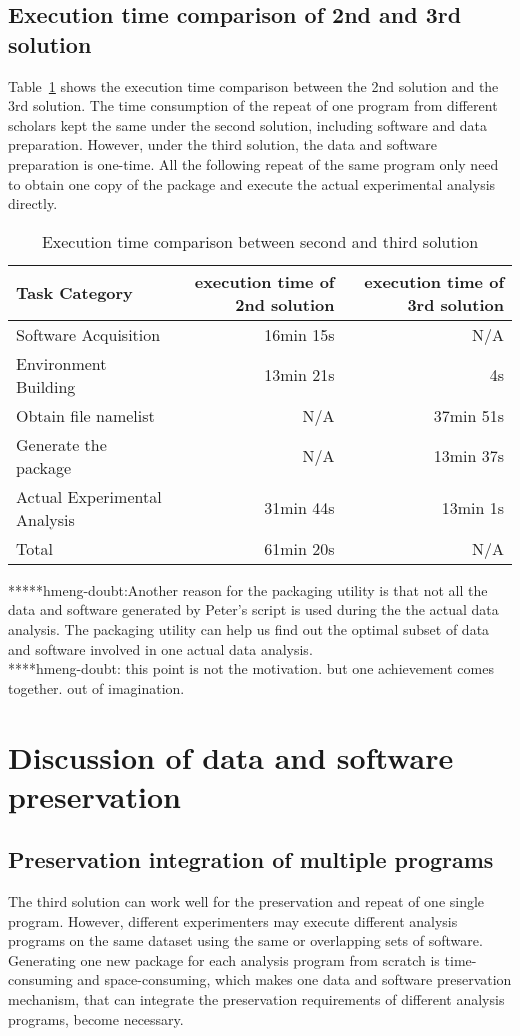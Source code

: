 \documentclass{article}
\begin{document}
\subsection{Execution time comparison of 2nd and 3rd solution}
\indent Table~\ref{table:time-2nd3rd} shows the execution time comparison between the 2nd solution and the 3rd solution. The time consumption of the repeat of one program from different scholars kept the same under the second solution, including software and data preparation. However, under the third solution, the data and software preparation is one-time. All the following repeat of the same program only need to obtain one copy of the package and execute the actual experimental analysis directly.

\begin{table}
    \centering
    \begin{tabular}{|l|r|r|}
    \hline
    Task Category & execution time of 2nd solution & execution time of 3rd solution \\ \hline
    Software Acquisition & 16min 15s & N/A \\ \hline
    Environment Building & 13min 21s  & 4s \\ \hline
    Obtain file namelist & N/A & 37min 51s \\ \hline
    Generate the package & N/A & 13min 37s \\ \hline
    Actual Experimental Analysis & 31min 44s & 13min 1s \\ \hline
    Total & 61min 20s & N/A \\ \hline
    \end{tabular}
    \caption{Execution time comparison between second and third solution}
    \label{table:time-2nd3rd}
\end{table}    

*****hmeng-doubt:Another reason for the packaging utility is that not all the data and software generated by Peter’s script is used during the the actual data analysis. The packaging utility can help us find out the optimal subset of data and software involved in one actual data analysis. \\
\indent *****hmeng-doubt: this point is not the motivation. but one achievement comes together. out of imagination.

\section{Discussion of data and software preservation}
\subsection{Preservation integration of multiple programs}
\indent The third solution can work well for the preservation and repeat of one single program. However, different experimenters may execute different analysis programs on the same dataset using the same or overlapping sets of software. Generating one new package for each analysis program from scratch is time-consuming and space-consuming, which makes one data and software preservation mechanism, that can integrate the preservation requirements of different analysis programs, become necessary. \\
\end{document}
